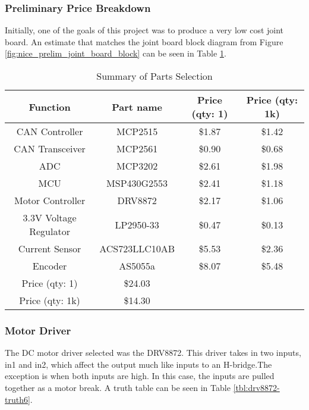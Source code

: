\subsubsection{Preliminary Price Breakdown}
Initially, one of the goals of this project was to produce a very low cost joint board. An estimate that matches the joint board block diagram from Figure \ref{fig:nice_prelim_joint_board_block} can be seen in Table \ref{tbl:Summary of Parts Selection}.
\begin{table}[H]
\centering
\caption{Summary of Parts Selection}

\begin{tabular}{|c|c|c|c|}
	
	\hline
	Function & Part name & Price (qty: 1) & Price (qty: 1k) \\
	\hline
	
	CAN Controller & MCP2515 & \$1.87 & \$1.42 \\
	
	CAN Transceiver & MCP2561 & \$0.90 & \$0.68 \\
	
	ADC & MCP3202 & \$2.61 & \$1.98 \\
	
	MCU & MSP430G2553 & \$2.41 & \$1.18 \\
	
	Motor Controller & DRV8872 & \$2.17 & \$1.06 \\
	
	3.3V Voltage Regulator & LP2950-33 & \$0.47 & \$0.13 \\
	
	Current Sensor & ACS723LLC10AB & \$5.53 & \$2.36 \\
	
	Encoder & AS5055a & \$8.07 & \$5.48 \\
	\hline
	\hline
	Price (qty: 1) & \$24.03 & & \\
	
	Price (qty: 1k) & \$14.30 & & \\
	\hline
	
\end{tabular}

\label{tbl:Summary of Parts Selection}
\end{table}	

\subsubsection{Motor Driver}
The DC motor driver selected was the DRV8872. This driver takes in two inputs, in1 and in2, which affect the output much like inputs to an H-bridge.The exception is when both inputs are high. In this case, the inputs are pulled together as a motor break. A truth table can be seen in Table \ref{tbl:drv8872-truth6}.

